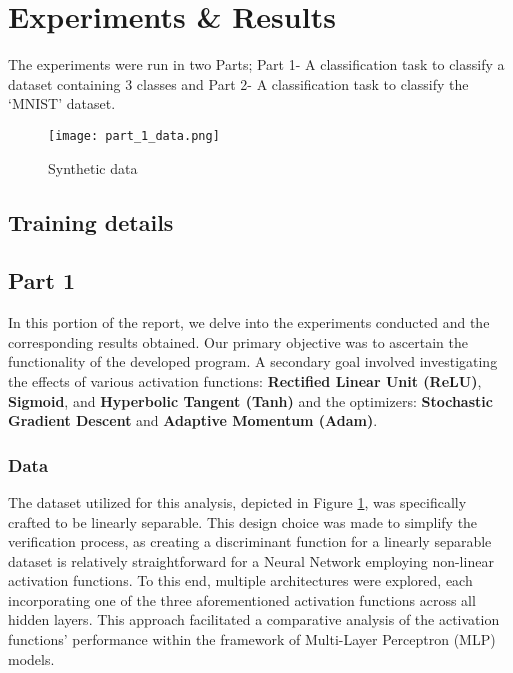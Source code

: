 \section{Experiments \& Results}

The experiments were run in two Parts; Part 1- A classification task to classify a dataset containing 3 classes and 
Part 2- A classification task to classify the `MNIST' dataset.

\begin{figure}
    \centering
    \texttt{[image: part\_1\_data.png]}
    \caption[short]{Synthetic data}
    \label{fig: Synthetic data}
\end{figure}

\subsection{Training details}


\subsection{Part 1}

In this portion of the report, we delve into the experiments conducted and the
corresponding results obtained. Our primary objective was to ascertain the 
functionality of the developed program. A secondary goal involved investigating 
the effects of various activation functions: \textbf{Rectified Linear Unit (ReLU)}, 
\textbf{Sigmoid}, and \textbf{Hyperbolic Tangent (Tanh)} and the optimizers: 
\textbf{Stochastic Gradient Descent} and \textbf{Adaptive Momentum (Adam)}. 

\subsubsection{Data}
The dataset utilized for 
this analysis, depicted in Figure \ref{fig: Synthetic data}, was specifically 
crafted to be linearly separable. This design choice was made to simplify the 
verification process, as creating a discriminant function for a linearly 
separable dataset is relatively straightforward for a Neural Network employing 
non-linear activation functions. To this end, multiple architectures were 
explored, each incorporating one of the three aforementioned activation 
functions across all hidden layers. This approach facilitated a comparative 
analysis of the activation functions' performance within the framework of 
Multi-Layer Perceptron (MLP) models. 

